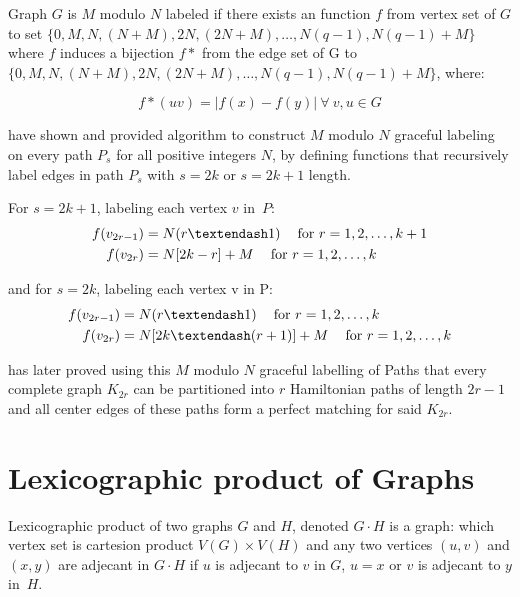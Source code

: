 Graph $G$ is $M$ modulo $N$ labeled if there exists an function $f$ from vertex set of $G$ to set $ \{ 0, M, 
N, (N + M), 2N, (2N + M), \dots, N(q - 1), N(q - 1) + M\} $ where $f$ induces a bijection $f*$ from the edge set of G to $ \{ 0, M, N, (N + M), 2N, (2N + M),\dots, N(q - 1), N(q - 1) + M\} $, where:

\begin{equation}
f\ast (uv)=|f(x) - f(y)|\:\forall\:  v,u \in G \label{eq:gracefullBijection}
\end{equation}

\textcite{Velmurugan2019graceful} have shown and provided algorithm to construct $M$ modulo $N$ graceful labeling on every path $P_s$ for all positive integers $N$, by defining functions that recursively label edges in path $P_s$ with $s=2k$ or $s=2k+1$ length.

For $s=2k+1$, labeling each vertex $v$ in~$P$:
\begin{equation}
\begin{split}
 f(v_{2r-1}) &= N(r – 1)\: \text{\quad for $r = 1, 2, \dots, k + 1$} \\
 f(v_{2r}) &=N[2k - r] + M\: \text{\quad for $r = 1, 2,\dots, k$}
\end{split}
\end{equation}

and for $s=2k$, labeling each vertex v in P:
\begin{equation}
\begin{split}
f(v_{2r-1}) &= N(r – 1 )\: \text{\quad for $r = 1, 2,\dots, k$} \\
f(v_{2r}) &=N[2k – (r + 1 )] + M\: \text{\quad for $r = 1, 2,\dots, k$}
\end{split}
\end{equation}


\textcite{ALBERTSON20102725} has later proved using this $M$ modulo $N$ graceful labelling of Paths that every complete graph $K_{2r}$ can be partitioned into $r$ Hamiltonian paths of length $2r-1$ and all center edges of these paths form a perfect matching for said $K_{2r}$.

\section{Lexicographic product of Graphs}

Lexicographic product of two graphs $G$ and $H$, denoted $G \cdot H$ is a graph: which vertex set is cartesion product $V(G) \times V(H)$ and any two vertices $(u,v)$ and $(x,y)$ are adjecant in $G \cdot H$ if $u$ is adjecant to $v$ in $G$, $u=x$ or $v$ is adjecant to $y$ in~$H$.


